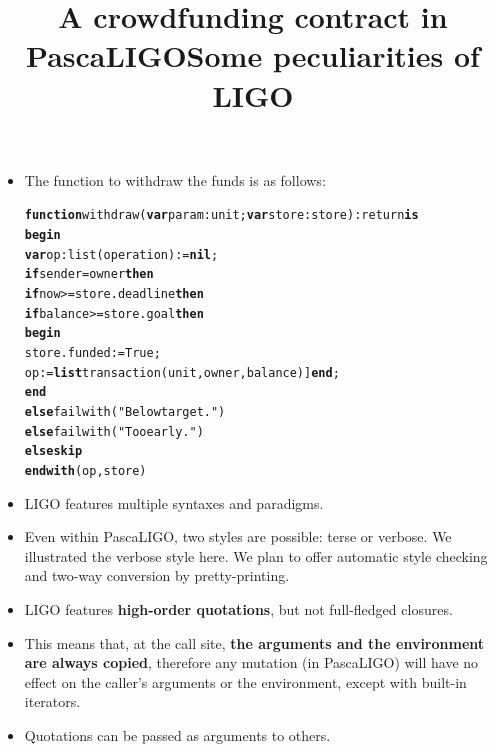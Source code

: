 \documentclass[wide]{slides}
\begin{document}
\begin{slide}
  \title{A crowdfunding contract in PascaLIGO}

  \begin{itemize}

    \item The function to withdraw the funds is as follows:
      \smallskip
      \begin{alltt}
\textbf{function} withdraw (\textbf{var} param : unit; \textbf{var} store : store) : return \textbf{is}
  \textbf{begin}
    \textbf{var} op : list (operation) := \textbf{nil};
    \textbf{if} sender = owner \textbf{then}
      \textbf{if} now >= store.deadline \textbf{then}
        \textbf{if} balance >= store.goal \textbf{then}
           \textbf{begin}
             store.funded := True;
             op := \textbf{list} transaction (unit, owner, balance)] \textbf{end};
           \textbf{end}
        \textbf{else} failwith ("Below target.")
      \textbf{else} failwith ("Too early.")
    \textbf{else skip}
  \textbf{end with} (op, store)
\end{alltt}

  \end{itemize}

\end{slide}

\begin{slide}
  \title{Some peculiarities of LIGO}

  \begin{itemize}

    \item LIGO features multiple syntaxes and paradigms.

    \item Even within PascaLIGO, two styles are possible: terse or
      verbose. We illustrated the verbose style here. We plan to offer
      automatic style checking and two-way conversion by
      pretty\hyp{}printing.

    \item LIGO features \textbf{high-order quotations}, but not
      full-fledged closures.

    \item This means that, at the call site, \textbf{the arguments
      and the environment are always copied}, therefore any mutation
      (in PascaLIGO) will have no effect on the caller's arguments or
      the environment, except with built-in iterators.

    \item Quotations can be passed as arguments to others.

  \end{itemize}

\end{slide}
\end{document}
